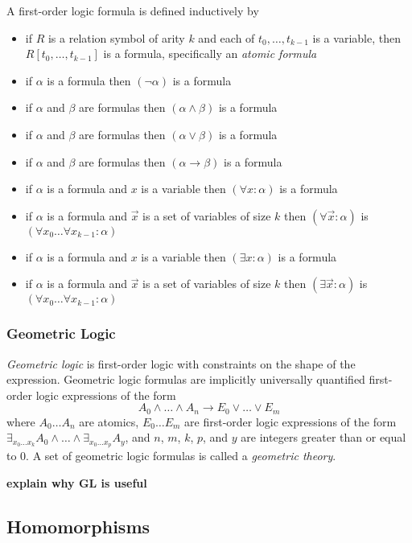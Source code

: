		A first-order logic formula is defined inductively by
		\begin{itemize}
		\item if $R$ is a relation symbol of arity $k$ and each of $t_0 , \ldots , t_{k-1}$ is a variable, then $R[t_0,\ldots,t_{k-1}]$ is a formula, specifically an \emph{atomic formula}
		\item if $\alpha$ is a formula then $(\neg\alpha)$ is a formula
		\item if $\alpha$ and $\beta$ are formulas then $(\alpha\wedge\beta)$ is a formula
		\item if $\alpha$ and $\beta$ are formulas then $(\alpha\vee\beta)$ is a formula
		\item if $\alpha$ and $\beta$ are formulas then $(\alpha\to\beta)$ is a formula
		\item if $\alpha$ is a formula and $x$ is a variable then $(\forall x : \alpha)$ is a formula
		\item if $\alpha$ is a formula and $\vec{x}$ is a set of variables of size $k$ then $(\forall \vec{x} : \alpha)$ is $(\forall x_0 \ldots \forall x_{k-1} : \alpha)$
		\item if $\alpha$ is a formula and $x$ is a variable then $(\exists x : \alpha)$ is a formula
		\item if $\alpha$ is a formula and $\vec{x}$ is a set of variables of size $k$ then $(\exists \vec{x} : \alpha)$ is $(\forall x_0 \ldots \forall x_{k-1} : \alpha)$
		\end{itemize}

		\subsubsection{Geometric Logic}

		\emph{Geometric logic} is first-order logic with constraints on the
		shape of the expression.  Geometric logic formulas are implicitly
		universally quantified first-order logic expressions of the form \[A_0
		\wedge \ldots \wedge A_n \to E_0 \vee \ldots \vee E_m\] where $A_0
		\ldots A_n$ are atomics, $E_0 \ldots E_m$ are first-order logic
		expressions of the form $\exists_{x_0 \ldots x_k} A_0 \wedge \ldots
		\wedge \exists_{x_0 \ldots x_p} A_y$, and $n$, $m$, $k$, $p$, and $y$
		are integers greater than or equal to $0$. A set of geometric logic
		formulas is called a \emph{geometric theory}.

		\textbf{explain why GL is useful}


	\subsection{Homomorphisms}


